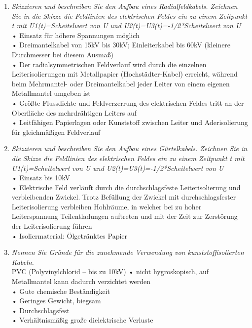 \documentclass[12pt]{article}
\begin{document}
\begin{enumerate}
    \item \textit{Skizzieren und beschreiben Sie den Aufbau eines Radialfeldkabels. Zeichnen Sie in die Skizze die Feldlinien des elektrischen Feldes ein zu einem Zeitpunkt t mit 
    U1(t)=Scheitelwert von U und U2(t)=U3(t)=-1/2*Scheitelwert von U}\\
    • Einsatz für höhere Spannungen möglich\\
    • Dreimantelkabel von 15kV bis 30kV; Einleiterkabel bis 60kV (kleinere Durchmesser bei diesem Ausmaß)\\
    • Der radialsymmetrischen Feldverlauf wird durch die einzelnen Leiterisolierungen mit Metallpapier 
    (Hochstädter-Kabel) erreicht, während beim Mehrmantel- oder Dreimantelkabel jeder Leiter von einem eigenen 
    Metallmantel umgeben ist\\
    • Größte Flussdichte und Feldverzerrung des elektrischen Feldes tritt an der Oberfläche des mehrdrähtigen 
    Leiters auf\\
    • Leitfähigen Papierlagen oder Kunststoff zwischen Leiter und Aderisolierung für gleichmäßigen Feldverlauf\\
    \clearpage
    \item \textit{Skizzieren und beschreiben Sie den Aufbau eines Gürtelkabels. Zeichnen Sie in die Skizze die 
    Feldlinien des elektrischen Feldes ein zu einem Zeitpunkt t mit U1(t)=Scheitelwert von U und U2(t)=U3(t)=-1/2*Scheitelwert von U}\\
    • Einsatz bis 10kV\\
    • Elektrische Feld verläuft durch die durchschlagsfeste Leiterisolierung und verbleibenden Zwickel. Trotz Befüllung der Zwickel mit durchschlagsfester Leiterisolierung verbleiben Hohlräume, in welcher bei zu hoher Leiterspannung Teilentladungen auftreten und mit der Zeit zur Zerstörung der Leiterisolierung führen
    \\• Isoliermaterial: Ölgetränktes Papier\\
    \item \textit{Nennen Sie Gründe für die zunehmende Verwendung von kunststoffisolierten Kabeln.}\\
    PVC (Polyvinylchlorid – bis zu 10kV)
    • nicht hygroskopisch, auf Metallmantel kann dadurch verzichtet werden\\
    • Gute chemische Beständigkeit\\
    • Geringes Gewicht, biegsam\\
    • Durchschlagsfest \\
    • Verhältnismäßig große dielektrische Verluste\\
    

\end{enumerate}
\end{document}
